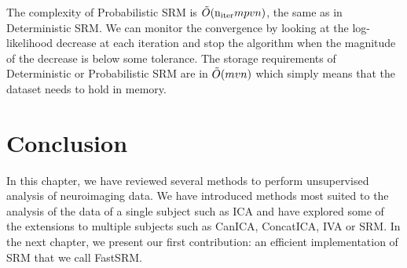 The complexity of Probabilistic SRM is $\tilde{O}(\mathrm{n_{iter}} mpvn)$, the same as in
Deterministic SRM.
We can monitor the convergence by looking at the log-likelihood decrease at each iteration
and stop the algorithm when the magnitude of the decrease is below some
tolerance.
The storage requirements of Deterministic or Probabilistic SRM are in
$\tilde{O}(mvn)$ which simply means that the dataset needs to hold in memory.

\section{Conclusion}
In this chapter, we have reviewed several methods to perform unsupervised
analysis of neuroimaging data. We have introduced methods most suited to the analysis
of the data of a single subject such as ICA and have explored some of the
extensions to multiple subjects such as CanICA, ConcatICA, IVA or SRM.
In the next chapter, we present our first contribution: an efficient
implementation of SRM that we call FastSRM.






